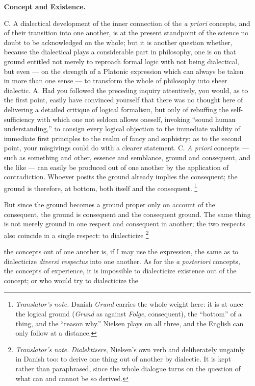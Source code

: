 \documentclass[12pt,a4paper]{book}
\renewcommand{\thefootnote}{\ifcase\value{footnote}\or *)\or **)\or ***)\fi}
\newcommand{\tnote}[1]{%
  \begingroup
  \renewcommand{\thefootnote}{\textdagger}%
  \footnote{\emph{Translator's note.} #1}%
  \addtocounter{footnote}{-1}%
  \endgroup}
\begin{document}
\textbf{Concept and Existence.}
C. A dialectical development of the inner connection of the \textit{a priori}
concepts, and of their transition into one another, is at the present standpoint
of the science no doubt to be acknowledged on the whole; but it is another
question whether, because the dialectical plays a considerable part in
philosophy, one is on that ground entitled not merely to reproach formal logic
with not being dialectical, but even --- on the strength of a Platonic
expression which can always be taken in more than one sense --- to transform
the whole of philosophy into sheer dialectic. A. Had you followed the preceding
inquiry attentively, you would,
as to the first point, easily have convinced yourself that there was no thought
here of delivering a detailed critique of logical formalism, but only of
rebuffing the self-sufficiency with which one not seldom allows oneself,
invoking ``sound human understanding,'' to consign every logical objection to
the immediate validity of immediate first principles to the realm of fancy and
sophistry; as to the second point, your misgivings could do with a clearer
statement. C. \textit{A priori} concepts --- such as something and other,
essence and semblance, ground and consequent, and the like --- can easily be
produced out of one another by the application of contradiction. Whoever posits
the ground already implies the consequent; the ground is therefore, at bottom,
both itself and the consequent.\tnote{Danish \emph{Grund} carries the whole
weight here: it is at once the logical ground (\textit{Grund} as against
\textit{Folge}, consequent), the ``bottom'' of a thing, and the ``reason why.''
Nielsen plays on all three, and the English can only follow at a distance.} But
since the ground becomes a ground proper only on account of the consequent, the
ground is consequent and the consequent ground. The same thing is not merely
ground in one respect and consequent in another; the two respects also coincide
in a single respect: to dialecticize\tnote{\emph{Dialektisere}, Nielsen's own
verb and deliberately ungainly in Danish too: to derive one thing out of
another by dialectic. It is kept rather than paraphrased, since the whole
dialogue turns on the question of what can and cannot be so derived.} the
concepts out of one another is, if I may use the expression, the same as to
dialecticize \textit{diversi respectus} into one another. As for the \textit{a
posteriori} concepts, the concepts of experience, it is impossible to
dialecticize existence out of the concept; or who would try to dialecticize the
\end{document}
